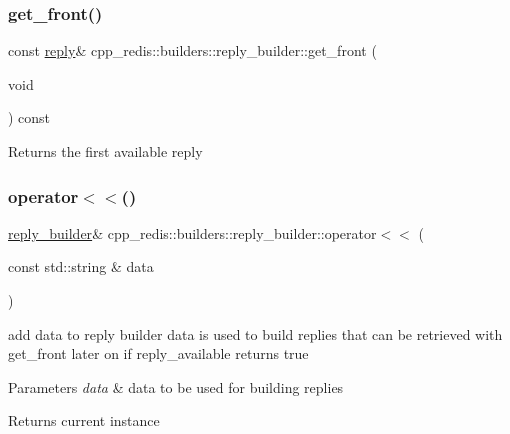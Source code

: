 \subsubsection{\texorpdfstring{get\+\_\+front()}{get\_front()}}
{\footnotesize\ttfamily const \hyperlink{classcpp__redis_1_1reply}{reply}\& cpp\+\_\+redis\+::builders\+::reply\+\_\+builder\+::get\+\_\+front (\begin{DoxyParamCaption}\item[{void}]{ }\end{DoxyParamCaption}) const}

\begin{DoxyReturn}{Returns}
the first available reply 
\end{DoxyReturn}
\mbox{\label{classcpp__redis_1_1builders_1_1reply__builder_a5f675e309a7a6002d582293c6410c967}} 
\subsubsection{\texorpdfstring{operator$<$$<$()}{operator<<()}}
{\footnotesize\ttfamily \hyperlink{classcpp__redis_1_1builders_1_1reply__builder}{reply\+\_\+builder}\& cpp\+\_\+redis\+::builders\+::reply\+\_\+builder\+::operator$<$$<$ (\begin{DoxyParamCaption}\item[{const std\+::string \&}]{data }\end{DoxyParamCaption})}

add data to reply builder data is used to build replies that can be retrieved with get\+\_\+front later on if reply\+\_\+available returns true


\begin{DoxyParams}{Parameters}
{\em data} & data to be used for building replies \\
\hline
\end{DoxyParams}
\begin{DoxyReturn}{Returns}
current instance 
\end{DoxyReturn}
\mbox{\label{classcpp__redis_1_1builders_1_1reply__builder_a71c0c93754b0bffb9c84c86ac3096bc4}} 
